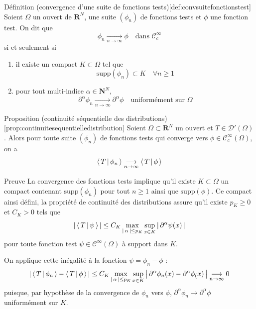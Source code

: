         \begin{omed}{Définition (convergence d’une suite de fonctions tests)}[def:convsuitefonctionstest]
            Soient $\Omega$ un ouvert de $\mathbf{R}^N$, une suite $(\phi_n)$ de fonctions tests et $\phi$ une fonction test. On dit que 
            \[ \phi_n \underset{n \to \infty}{\longrightarrow} \phi \quad \text{dans } \mathcal{C}_c^{\infty} \]   
            si et seulement si 
            \begin{enumerate}[label=($p_{\arabic*}$)]
                \item il existe un compact $K \subset \Omega$ tel que
                \[ \text{supp}(\phi_n) \subset K \quad \forall n \geq 1 \]   
                \item pour tout multi-indice $\alpha \in \mathbf{N}^N$, 
                \[ \partial^{\alpha} \phi_n \underset{n \to \infty}{\longrightarrow} \partial^{\alpha} \phi \quad \text{uniformément sur } \Omega \]
            \end{enumerate}
        \end{omed}

        \begin{omed}{Proposition (continuité séquentielle des distributions)}[prop:continuitesequentielledistribution]
            Soient $\Omega \subset \mathbf{R}^N$ un ouvert et $T \in \mathcal{D}'(\Omega)$. Alors pour toute suite $(\phi_n)$ de fonctions tests qui converge vers $\phi \in \mathcal{C}_c^{\infty}(\Omega)$, on a 
            \[ \left< \, T \, \middle| \, \phi_n \, \right> \underset{n \to \infty}{\longrightarrow} \left< \, T \, \middle| \, \phi \, \right> \]   
        \end{omed}

        \begin{demo}{Preuve}
            La convergence des fonctions tests implique qu’il existe $K \subset \Omega$ un compact contenant $\text{supp}(\phi_n)$ pour tout $n \geq 1$ ainsi que $\text{supp}(\phi)$. Ce compact ainsi défini, la propriété de continuité des distributions assure qu’il existe $p_K \geq 0$ et $C_K > 0$ tels que 
            \[ \left\lvert \, \left< \, T \, \middle| \, \psi \, \right> \, \right\rvert \leq C_K \max_{\left\lvert \, \alpha \, \right\rvert \leq p_K} \sup_{x \in K} \left\lvert \, \partial^{\alpha} \psi(x) \, \right\rvert \]   
            pour toute fonction test $\psi \in \mathcal{C}^{\infty}(\Omega)$ à support dans $K$. 

            On applique cette inégalité à la fonction $\psi = \phi_n - \phi$ :
            \[ \left\lvert \, \left< \, T \, \middle| \, \phi_n \, \right> - \left< \, T \, \middle| \, \phi \, \right> \, \right\rvert \leq C_K \max_{\left\lvert \, \alpha \, \right\rvert \leq p_K} \sup_{x \in K} \left\lvert \, \partial^{\alpha} \phi_n(x) - \partial^{\alpha} \phi_(x) \, \right\rvert \underset{n \to \infty}{\longrightarrow} 0 \] 
            puisque, par hypothèse de la convergence de $\phi_n$ vers $\phi$, $\partial^{\alpha} \phi_n \to \partial^{\alpha} \phi$ uniformément sur $K$.
        \end{demo}

